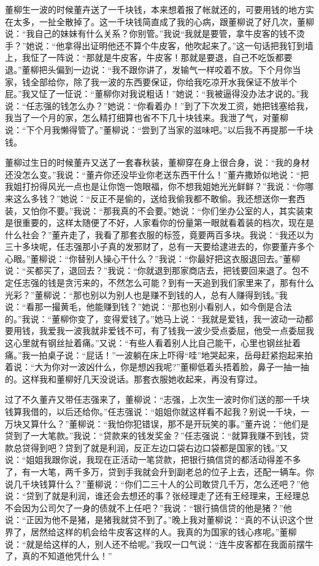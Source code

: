 \documentclass[12pt,oneside]{book}
\begin{document}
董柳生一波的时候董卉送了一千块钱，本来想着报了帐就还的，可要用钱的地方实在太多，一扯全散掉了。这一千块钱简直成了我的心病，跟董柳说了好几次，董柳说：``我自己的妹妹有什么关系？你别管。''我说``我就是要管，拿牛皮客的钱不烫手？''她说：``他拿得出证明他还不算个牛皮客，他吹起来了。''这一句话把我钉到墙上，我怔了一阵说：``那就是牛皮客，牛皮客！那就是要退，自己不吃饭都要退。''董柳把头偏到一边说：``我不跟你讲了，发输气一样咬着不放。下个月你当家，钱全部给你，除了我一波的东西要保证，你给我吃凉开水我保证不放半个屁。''我又怔了一怔说：``董柳你对我说粗话！''她说：``我被逼得没办法才说的。''我说：``任志强的钱怎么办？''她说：``你看着办！''到了下次发工资，她把钱塞给我，我当了一个月的家，怎么精打细算也省不下几十块钱来。我泄了气，对董柳说：``下个月我懒得管了。''董柳说：``尝到了当家的滋味吧。''以后我不再提那一千块钱。

董柳过生日的时候董卉又送了一套春秋装，董柳穿在身上很合身，说：``我的身材还没怎么变。''我说：``董卉你还没毕业你老送东西干什么！''董卉撒娇似地说：``把我姐打扮得风光一点也是让你饱一饱眼福，你不想我姐她光光鲜鲜？''我说：``你哪来这么多钱？''她说：``反正不是偷的，送给我偷我都不敢偷。我还想送你一套西装，又怕你不要。''我说：``那我真的不会要。''她说：``你们坐办公室的人，其实装束是很重要的，这样太随便了不好，人家看你的份量第一眼就看着装的档次，现在是什么社会？''董卉走了，我看了那套衣服的标签，竟要两百多块。我说：``我还以为三十多块呢，任志强那小子真的发邪财了，总有一天要给逮进去的，你要董卉多个心眼。''董柳说：``你替别人操心干什么？''我说：``你最好把这衣服退回去。''董柳说：``买都买了，退回去？''我说：``你就退到那家商店去，把钱要回来退了。包不定任志强的钱是贪污来的，不然怎么可能？到有一天追到我们家里来了，那有什么光彩？''董柳说：``那也别以为别人也是赚不到钱的人，总有人赚得到钱。''我说：``看那一撮黄毛，他能赚到钱？''她说：``那也别小看别人，如今倒是合法的。''我说：``董柳你变了，变得爱钱了。''她马上说：``我就是爱钱，我一波动一动都要用钱，我爱我一波我就非爱钱不可，有了钱我一波少受点委屈，他受一点委屈我这心里就有钢丝扯着痛。''又说：``有些人看着别人比自己能干，心里也钢丝扯着痛。''我一拍桌子说：``屁话！''一波躺在床上吓得``哇''地哭起来，岳母赶紧抱起来拍着说：``大为你对一波凶什么，你是想凶我呢?''董柳低着头捂着脸，鼻子一抽一抽的。这样我和董柳好几天没说话。那套衣服她收起来，再没有穿过。

过了不久董卉又带任志强来了，董柳说：``志强，上次生一波时你们送的那一千块钱算我借的，以后还给你。''任志强说：``姐姐你就这样看不起我？别说一千块，一万块又算什么？''董柳说：``我怕你犯错误，那不是开玩笑的事。''董卉说：``他们是贷到了一大笔款。''我说：``贷款来的钱发奖金？''任志强说：``就算我赚不到钱，贷款总贷得到吧？贷到了就是利润，反正左边口袋右边口袋都是国家的钱。''又说：``姐姐我跟你说，我现在正活动一笔贷款，把银行搞信贷的都活动得差不多了，有一大笔，两千多万，贷到手我就会升到副老总的位子上去，还配一辆车。你说几千块钱算什么？''董柳说：``你们二三十人的公司敢贷几千万，怎么还吧？''他说：``贷到了就是利润，谁还会去想还的事？张经理走了还有王经理来，王经理总不会因为公司欠了一身的债就不上任吧？''我说：``银行搞信贷的他是猪？''他说：``正因为他不是猪，是猪我就贷不到了。''晚上我对董柳说：``真的不认识这个世界了，居然给这样的机会给牛皮客这样的人。我真的为国家的钱心疼呢。''董柳说：``就是给这样的人，别人还不给呢。''我叹一口气说：``连牛皮客都在我面前摆牛了，真的不知道他凭什么！''
\end{document}
